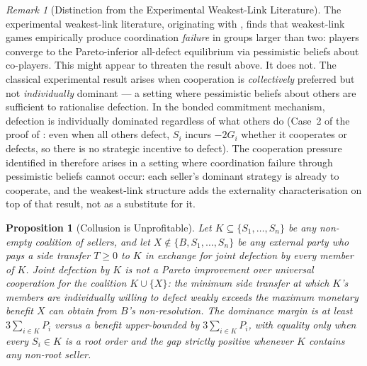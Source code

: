 \documentclass[11pt,a4paper]{article}
\newtheorem{proposition}[theorem]{Proposition}
\theoremstyle{definition}
\theoremstyle{remark}
\newtheorem{remark}[theorem]{Remark}
\newcommand{\pay}{P}           %
\newcommand{\cumval}{G}        %
\begin{document}
\begin{remark}[Distinction from the Experimental Weakest-Link Literature]
\label{rem:vanhuyck}
The experimental weakest-link literature, originating with
\citet{vanhuyck1990},
finds that weakest-link games empirically produce coordination
\emph{failure} in groups larger than two: players converge to the
Pareto-inferior all-defect equilibrium via pessimistic beliefs about
co-players. This might appear to threaten the result above. It does
not. The classical experimental result arises when cooperation is
\emph{collectively} preferred but not \emph{individually} dominant ---
a setting where pessimistic beliefs about others are sufficient to
rationalise defection. In the bonded commitment mechanism, defection
is individually dominated regardless of what others do (Case~2 of the
proof of : even when all others defect, $S_i$
incurs $-2\cumval_i$ whether it cooperates or defects, so there is no
strategic incentive to defect). The cooperation pressure identified in
 therefore arises in a setting where
coordination failure through pessimistic beliefs cannot occur: each
seller's dominant strategy is already to cooperate, and the weakest-link
structure adds the externality characterisation on top of that result,
not as a substitute for it.
\end{remark}

\begin{proposition}[Collusion is Unprofitable]
\label{prop:collusion-unprofitable}
Let $K \subseteq \{S_1, \ldots, S_n\}$ be any non-empty coalition
of sellers, and let $X \notin \{B, S_1, \ldots, S_n\}$ be any
external party who pays a side transfer $T \geq 0$ to $K$ in
exchange for joint defection by every member of $K$. Joint
defection by $K$ is not a Pareto improvement over universal
cooperation for the coalition $K \cup \{X\}$: the minimum side
transfer at which $K$'s members are individually willing to
defect weakly exceeds the maximum monetary benefit $X$ can
obtain from $B$'s non-resolution. The dominance margin is at
least $3 \sum_{i \in K} \pay_i$ versus a benefit upper-bounded
by $3 \sum_{i \in K} \pay_i$, with equality only when every
$S_i \in K$ is a root order and the gap strictly positive
whenever $K$ contains any non-root seller.
\end{proposition}
\end{document}
